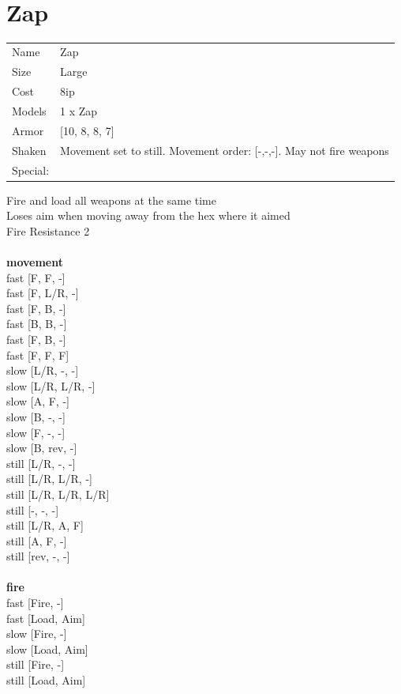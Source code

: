  
\ \\













\clearpage

\section{ Zap }

\begin{tabular}{ll}
  Name & Zap \\
  Size & Large\\
  Cost & 8ip\\
  Models & 1 x Zap\\
  Armor & [10, 8, 8, 7]\\
  Shaken & Movement set to still. Movement order: [-,-,-]. May not fire weapons\\
  Special: \\
\end{tabular}

\noindent Fire and load all weapons at the same time\\ 
Loses aim when moving away from the hex where it aimed\\ 
Fire Resistance 2\\ 


\ \\ {\bf movement } \\
fast [F, F, -] \\
fast [F, L/R, -] \\
fast [F, B, -] \\
fast [B, B, -] \\
fast [F, B, -] \\
fast [F, F, F] \\
slow [L/R, -, -] \\
slow [L/R, L/R, -] \\
slow [A, F, -] \\
slow [B, -, -] \\
slow [F, -, -] \\
slow [B, rev, -] \\
still [L/R, -, -] \\
still [L/R, L/R, -] \\
still [L/R, L/R, L/R] \\
still [-, -, -] \\
still [L/R, A, F] \\
still [A, F, -] \\
still [rev, -, -] \\
\ \\ {\bf fire } \\
fast [Fire, -] \\
fast [Load, Aim] \\
slow [Fire, -] \\
slow [Load, Aim] \\
still [Fire, -] \\
still [Load, Aim] \\


